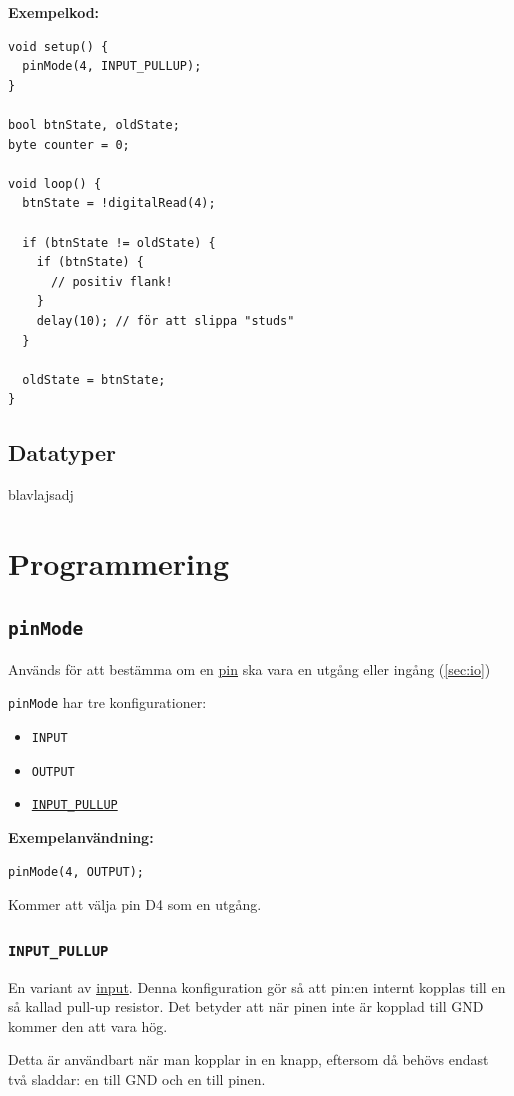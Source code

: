 \documentclass[11pt]{article}
\begin{document}
\newpage
\textbf{Exempelkod:}

\begin{lstlisting}
void setup() {
  pinMode(4, INPUT_PULLUP);
}

bool btnState, oldState;
byte counter = 0;

void loop() {
  btnState = !digitalRead(4);

  if (btnState != oldState) {
    if (btnState) {
      // positiv flank!
    }
    delay(10); // för att slippa "studs"
  }

  oldState = btnState;
}
\end{lstlisting}

\subsection{Datatyper}
blavlajsadj

\newpage
\section{Programmering}
\subsection{\texttt{pinMode}}\label{sec:pinmode}
Används för att bestämma om en \hyperref[sec:pin]{pin} ska vara en utgång eller
ingång (\ref{sec:io})

\texttt{pinMode} har tre konfigurationer:
\begin{itemize}
  \item \texttt{INPUT}
  \item \texttt{OUTPUT}
  \item \hyperref[sec:input_pullup]{\texttt{INPUT\_PULLUP}}
\end{itemize}

\textbf{Exempelanvändning:}
\begin{lstlisting}
pinMode(4, OUTPUT);
\end{lstlisting}
Kommer att välja pin D4 som en utgång.

\subsubsection{\texttt{INPUT\_PULLUP}}\label{sec:input_pullup}
En variant av \hyperref[sec:input]{input}. Denna konfiguration gör så att
pin:en internt kopplas till en så kallad pull-up resistor.
Det betyder att när pinen inte är kopplad till GND kommer den att vara hög.

Detta är användbart när man kopplar in en knapp, eftersom då behövs endast två
sladdar: en till GND och en till pinen.
\end{document}
